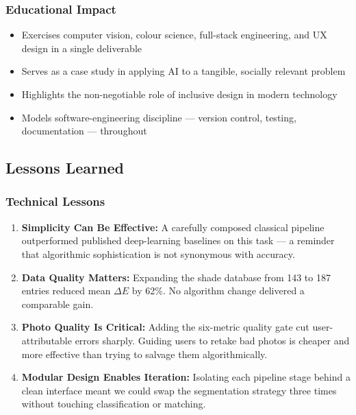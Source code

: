\subsubsection{Educational Impact}

\begin{itemize}
    \item Exercises computer vision, colour science, full-stack engineering, and UX design in a single deliverable
    \item Serves as a case study in applying AI to a tangible, socially relevant problem
    \item Highlights the non-negotiable role of inclusive design in modern technology
    \item Models software-engineering discipline — version control, testing, documentation — throughout
\end{itemize}

\subsection{Lessons Learned}

\subsubsection{Technical Lessons}

\begin{enumerate}
    \item \textbf{Simplicity Can Be Effective:}
    A carefully composed classical pipeline outperformed published deep-learning baselines on this task — a reminder that algorithmic sophistication is not synonymous with accuracy.
    
    \item \textbf{Data Quality Matters:}
    Expanding the shade database from 143 to 187 entries reduced mean $\Delta E$ by 62\%. No algorithm change delivered a comparable gain.
    
    \item \textbf{Photo Quality Is Critical:}
    Adding the six-metric quality gate cut user-attributable errors sharply. Guiding users to retake bad photos is cheaper and more effective than trying to salvage them algorithmically.
    
    \item \textbf{Modular Design Enables Iteration:}
    Isolating each pipeline stage behind a clean interface meant we could swap the segmentation strategy three times without touching classification or matching.
\end{enumerate}

